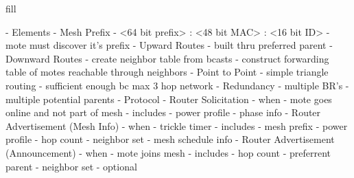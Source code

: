 fill

- Elements
    - Mesh Prefix
        - <64 bit prefix> : <48 bit MAC> : <16 bit ID>
        - mote must discover it's prefix
    - Upward Routes
        - built thru preferred parent
    - Downward Routes
        - create neighbor table from bcasts
        - construct forwarding table of motes reachable through neighbors
    - Point to Point
        - simple triangle routing
        - sufficient enough bc max 3 hop network
    - Redundancy
        - multiple BR's
        - multiple potential parents
- Protocol
    - Router Solicitation
        - when
            - mote goes online and not part of mesh
        - includes
            - power profile
            - phase info
    - Router Advertisement (Mesh Info)
        - when
            - trickle timer
        - includes
            - mesh prefix
            - power profile
            - hop count
            - neighbor set
            - mesh schedule info
    - Router Advertisement (Announcement)
        - when
            - mote joins mesh
        - includes
            - hop count
            - preferrent parent
            - neighbor set
        - optional
\fi

